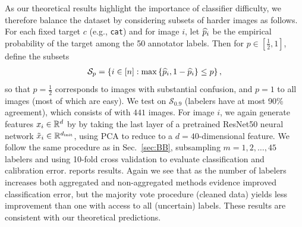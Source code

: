 		As our theoretical results highlight the importance of classifier
		difficulty, we therefore balance the dataset by considering subsets
		of harder images as follows. For each fixed target $c$ (e.g., \texttt{cat})
		and for image $i$, let $\widehat{p}_i$ be the empirical
		probability of the target among the 50 annotator labels.
		Then for $p \in [\frac{1}{2}, 1]$, define the subsets
		\begin{align*}
			\mathcal{S}_p = \left\{i \in [n]
			: \max\left\{\widehat{p}_i, 1 - \widehat{p}_i\right\} \leq p\right\},
		\end{align*}
		so that $p = \frac{1}{2}$ corresponds to images with substantial confusion,
		and $p = 1$ to all images (most of which are easy).  We test on
		$\mathcal{S}_{0.9}$ (labelers have at most 90\% agreement), which consists
		of with $441$ images. For image $i$, we again generate features $x_i \in
		\mathbb{R}^d$ by by taking the last layer of a pretrained ResNet50 neural network
		$\tilde{x}_i \in \mathbb{R}^{d_{\textup{init}}}$, using PCA to reduce
		to a $d = 40$-dimensional feature.
		We follow the same procedure as in Sec.~\ref{sec:BB}, subsampling
		$m = 1, 2, \ldots, 45$ labelers and using 10-fold cross validation
		to evaluate classification and calibration error.
		 reports results. Again we see that as the number of labelers
		increases both aggregated and non-aggregated methods evidence improved
		classification error, but the majority vote procedure (cleaned data) yields
		less improvement than one with access to all (uncertain) labels.  These
		results are consistent with our theoretical predictions.
		
